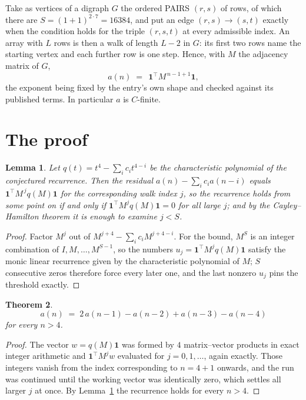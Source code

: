 \documentclass[11pt,a4paper]{article}
\theoremstyle{plain}
\newtheorem{theorem}{Theorem}
\newtheorem{lemma}[theorem]{Lemma}
\theoremstyle{definition}
\begin{document}
Take as vertices of a digraph $G$ the ordered PAIRS $(r,s)$ of rows, of which there are
$S=(1+1)^{2\cdot7}=16384$, and put an edge $(r,s)\to(s,t)$ exactly when the condition
holds for the triple $(r,s,t)$ at every admissible index. An array with $L$ rows is then a
walk of length $L-2$ in $G$: its first two rows name the starting vertex and each further
row is one step. Hence, with $M$ the adjacency matrix of $G$,
\[
a(n)\;=\;\,\mathbf{1}^{\!\top}M^{\,n-1+1}\mathbf{1},
\]
the exponent being fixed by the entry's own shape and checked against its published terms.
In particular $a$ is $C$-finite.

\section{The proof}

\begin{lemma}\label{lem:crit}
Let $q(t)=t^{4}-\sum_i c_it^{4-i}$ be the characteristic polynomial of the
conjectured recurrence. Then the residual $a(n)-\sum_ic_ia(n-i)$ equals
$\mathbf{1}^{\!\top}M^{\,j}q(M)\mathbf{1}$ for the corresponding walk index
$j$, so the recurrence holds from some point on if and only if
$\mathbf{1}^{\!\top}M^{j}q(M)\mathbf{1}=0$ for all large $j$; and by the
Cayley--Hamilton theorem it is enough to examine $j<S$.
\end{lemma}

\begin{proof}
Factor $M^{j}$ out of $M^{j+4}-\sum_ic_iM^{j+4-i}$. For the bound, $M^{S}$
is an integer combination of $I,M,\dots,M^{S-1}$, so the numbers
$u_j=\mathbf{1}^{\!\top}M^{j}q(M)\mathbf{1}$ satisfy the monic linear recurrence given by
the characteristic polynomial of $M$; $S$ consecutive zeros therefore force every later one,
and the last nonzero $u_j$ pins the threshold exactly.
\end{proof}

\begin{theorem}
\[
a(n)\;=\;2\,a(n-1) - a(n-2) + a(n-3) - a(n-4)
\]
for every $n>4$.
\end{theorem}

\begin{proof}
The vector $w=q(M)\mathbf{1}$ was formed by $4$ matrix--vector products in exact
integer arithmetic and $\mathbf{1}^{\!\top}M^{j}w$ evaluated for $j=0,1,\dots$, again
exactly. Those integers vanish from the index corresponding to $n=4+1$ onwards, and the
run was continued until the working vector was identically zero, which settles all larger $j$
at once. By Lemma~\ref{lem:crit} the recurrence holds for every $n>4$.
\end{proof}
\end{document}
